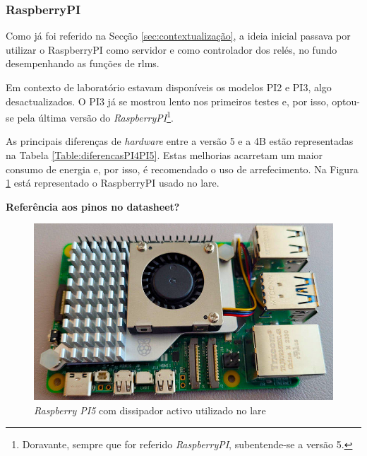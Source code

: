 \subsubsection{RaspberryPI}
Como já foi referido na Secção \ref{sec:contextualização}, a ideia inicial passava por utilizar o \gls{RaspberryPI} como servidor e como controlador dos relés, no fundo desempenhando as funções de \acrshort{rlms}.

Em contexto de laboratório estavam disponíveis os modelos PI2 e PI3, algo desactualizados. O PI3 já se mostrou lento nos primeiros testes e, por isso, optou-se pela última versão do \textit{RaspberryPI}\footnote{Doravante, sempre que for referido \textit{RaspberryPI}, subentende-se a versão 5.}.

As principais diferenças de \textit{hardware} entre a versão 5 e a 4B estão representadas na Tabela \ref{Table:diferencasPI4PI5}. Estas melhorias acarretam um maior consumo de energia e, por isso, é recomendado o uso de arrefecimento. Na Figura \ref{fig:pi5dissipador} está representado o \gls{RaspberryPI} usado no \acrshort{lare}.

\textbf{Referência aos pinos no datasheet?}

\begin{figure}[hbtp]
    \centering
    \includegraphics[width=1\textwidth]{figures/pi5_dissipador.png}
    \caption{\textit{Raspberry PI5} com dissipador activo utilizado no \acrshort{lare}}
    \label{fig:pi5dissipador}
\end{figure}

